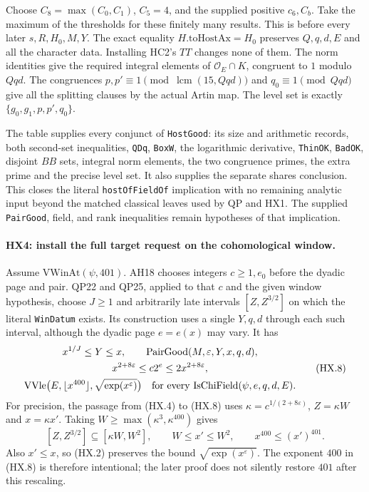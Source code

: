 Choose $C_8=\max(C_0,C_1)$, $C_5=4$, and the supplied positive
$c_6,C_b$.  Take the maximum of the thresholds for these finitely
many results.  This is before every later $s,R,H_0,M,Y$.
The exact equality $H.\mathrm{toHostAx}=H_0$ preserves $Q,q,d,E$
and all the character data.  Installing HC2's $TT$ changes none of
them.  The norm identities give the required integral elements of
$\mathcal O_E\cap K$, congruent to $1$ modulo $Qqd$.
The congruences $p,p'\equiv1\pmod{\operatorname{lcm}(15,Qqd)}$
and $q_0\equiv1\pmod{Qqd}$ give all the splitting clauses by the
actual Artin map.  The level set is exactly
$\{g_0,g_1,p,p',q_0\}$.

The table supplies every conjunct of \texttt{HostGood}: its size and
arithmetic records, both second-set inequalities, \texttt{QDq},
\texttt{BoxW}, the logarithmic derivative, \texttt{ThinOK},
\texttt{BadOK}, disjoint $BB$ sets, integral norm elements, the two
congruence primes, the extra prime and the precise level set.
It also supplies the separate shares conclusion.  This closes the
literal \texttt{hostOfFieldOf} implication with no remaining analytic
input beyond the matched classical leaves used by QP and HX1.
The supplied \texttt{PairGood}, field, and rank inequalities remain
hypotheses of that implication.

\paragraph{HX4: install the full target request on the cohomological window.}
Assume $\mathrm{VWinAt}(\psi,401)$.  AH18 chooses integers
$c\ge1,e_0$ before the dyadic page and pair.  QP22 and QP25, applied
to that $c$ and the given window hypothesis, choose $J\ge1$ and
arbitrarily late intervals $[Z,Z^{3/2}]$ on which the literal
\texttt{WinDatum} exists.  Its construction uses a single $Y,q,d$
through each such interval, although the dyadic page $e=e(x)$ may
vary.  It has
\[
 \begin{gathered}
 x^{1/J}\le Y\le x,\qquad \mathrm{PairGood}(M,\varepsilon,Y,x,q,d),\\
 x^{2+8\varepsilon}\le c2^e\le2x^{2+8\varepsilon},\\
 \mathrm{VVle}\bigl(E,\lfloor x^{400}\rfloor,
                  \sqrt{\exp(x^\varepsilon)}\bigr)
 \quad\hbox{for every }\mathrm{IsChiField}(\psi,e,q,d,E).
 \end{gathered}
 \tag{HX.8}
\]
For precision, the passage from (HX.4) to (HX.8) uses
$\kappa=c^{1/(2+8\varepsilon)}$, $Z=\kappa W$ and
$x=\kappa x'$.  Taking
$W\ge\max(\kappa^3,\kappa^{400})$ gives
\[
 [Z,Z^{3/2}]\subseteq[\kappa W,W^2],\qquad
 W\le x'\le W^2,\qquad x^{400}\le(x')^{401}.
 \tag{HX.9}
\]
Also $x'\le x$, so (HX.2) preserves the bound
$\sqrt{\exp(x^\varepsilon)}$.  The exponent $400$ in (HX.8) is
therefore intentional; the later proof does not silently restore
$401$ after this rescaling.

